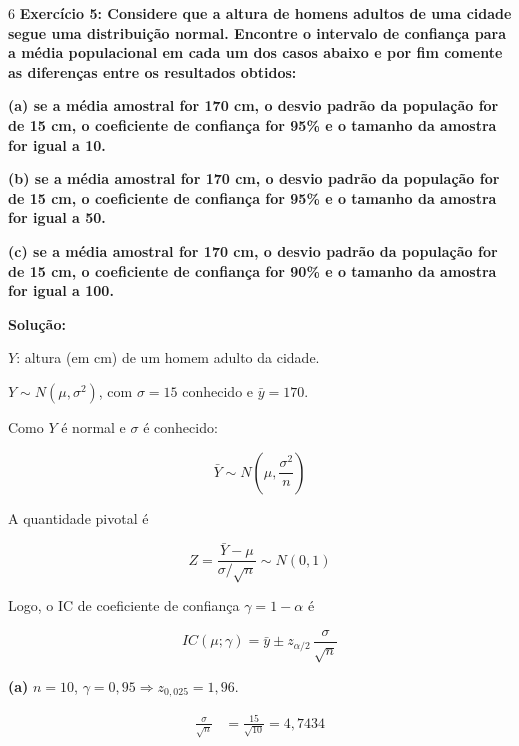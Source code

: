 \documentclass[8pt, a4paper, landscape]{extarticle}
\begin{document}
\begin{multicols}{6}
\textbf{Exercício 5: Considere que a altura de homens adultos de uma cidade segue uma distribuição normal. Encontre o intervalo de confiança para a média populacional em cada um dos casos abaixo e por fim comente as diferenças entre os resultados obtidos:}

\textbf{(a) se a média amostral for 170 cm, o desvio padrão da população for de 15 cm, o coeficiente de confiança for 95\% e o tamanho da amostra for igual a 10.}

\textbf{(b) se a média amostral for 170 cm, o desvio padrão da população for de 15 cm, o coeficiente de confiança for 95\% e o tamanho da amostra for igual a 50.}

\textbf{(c) se a média amostral for 170 cm, o desvio padrão da população for de 15 cm, o coeficiente de confiança for 90\% e o tamanho da amostra for igual a 100.}

\vspace{0.3cm}

\textbf{Solução:}

$Y$: altura (em cm) de um homem adulto da cidade.

$Y \sim N(\mu, \sigma^2)$, com $\sigma = 15$ conhecido e $\bar{y} = 170$.

Como $Y$ é normal e $\sigma$ é conhecido:

\begin{equation*}
\bar{Y} \sim N\left(\mu, \frac{\sigma^2}{n}\right)
\end{equation*}

A quantidade pivotal é

\begin{equation*}
Z = \frac{\bar{Y} - \mu}{\sigma/\sqrt{n}} \sim N(0,1)
\end{equation*}

Logo, o IC de coeficiente de confiança $\gamma = 1 - \alpha$ é

\begin{equation*}
IC(\mu;\gamma) = \bar{y} \pm z_{\alpha/2}\,\frac{\sigma}{\sqrt{n}}
\end{equation*}

\vspace{0.2cm}

\textbf{(a)} $n = 10$, $\gamma = 0,95 \Rightarrow z_{0,025} = 1,96$.

\begin{equation*}
\begin{split}
\frac{\sigma}{\sqrt{n}} &= \frac{15}{\sqrt{10}} = 4,7434
\end{split}
\end{equation*}


\end{multicols}
\end{document}
